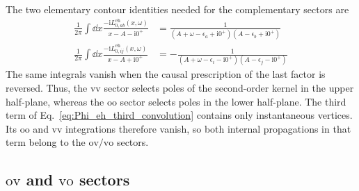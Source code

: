 \documentclass[aip,jcp,reprint,noshowkeys,superscriptaddress]{revtex4-1}
\newcommand{\eps}{\epsilon}
\newcommand{\ii}{\mathrm{i}}
\newcommand{\eh}{\text{eh}}
\begin{document}
The two elementary contour identities needed for the complementary sectors are
\begin{align}
    \frac{1}{2\pi}
    \int\dd{x}
    \frac{-\ii L_{0,ab}^{\eh}(x,\omega)}{x-A-\ii0^+}
    & =
    \frac{1}
    {(A+\omega-\eps_a+\ii0^+)(A-\eps_b+\ii0^+)}
    \label{eq:vv_elementary_contour}
    \\
    \frac{1}{2\pi}
    \int\dd{x}
    \frac{-\ii L_{0,ij}^{\eh}(x,\omega)}{x-A+\ii0^+}
    & =
    -\frac{1}
    {(A+\omega-\eps_i-\ii0^+)(A-\eps_j-\ii0^+)}
    \label{eq:oo_elementary_contour}
\end{align}
The same integrals vanish when the causal prescription of the last factor is
reversed.  Thus, the $\text{vv}$ sector selects poles of the second-order kernel
in the upper half-plane, whereas the $\text{oo}$ sector selects poles in the
lower half-plane.  The third term of
Eq.~\eqref{eq:Phi_eh_third_convolution} contains only instantaneous vertices.
Its $\text{oo}$ and $\text{vv}$ integrations therefore vanish, so both internal
propagations in that term belong to the $\text{ov}/\text{vo}$ sectors.

\subsection{$\text{ov}$ and $\text{vo}$ sectors}
\end{document}
